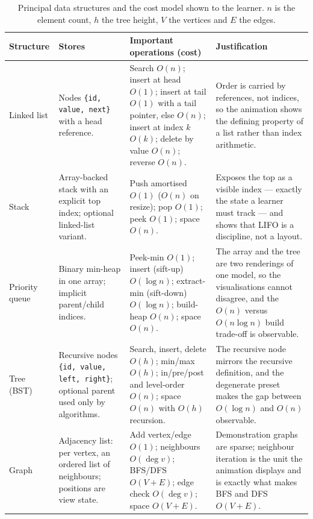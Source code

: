\documentclass[11pt,a4paper]{article}
\newcommand{\ct}[1]{\texttt{#1}}
\begin{document}
\begin{table}[H]
\centering
\small
\setlength{\tabcolsep}{4pt}
\begin{tabular}{@{}L{2.3cm}L{3.7cm}L{5.1cm}L{4.3cm}@{}}
\toprule
\textbf{Structure} & \textbf{Stores} & \textbf{Important operations (cost)} & \textbf{Justification} \\
\midrule
Linked list & Nodes \ct{\{id, value, next\}} with a head reference. &
Search $O(n)$; insert at head $O(1)$; insert at tail $O(1)$ with a tail pointer, else $O(n)$;
insert at index $k$ $O(k)$; delete by value $O(n)$; reverse $O(n)$. &
Order is carried by references, not indices, so the animation shows the defining property of a
list rather than index arithmetic. \\
Stack & Array-backed stack with an explicit top index; optional linked-list variant. &
Push amortised $O(1)$ ($O(n)$ on resize); pop $O(1)$; peek $O(1)$; space $O(n)$. &
Exposes the top as a visible index --- exactly the state a learner must track --- and shows that
LIFO is a discipline, not a layout. \\
Priority queue & Binary min-heap in one array; implicit parent/child indices. &
Peek-min $O(1)$; insert (sift-up) $O(\log n)$; extract-min (sift-down) $O(\log n)$;
build-heap $O(n)$; space $O(n)$. &
The array and the tree are two renderings of one model, so the visualisations cannot disagree,
and the $O(n)$ versus $O(n\log n)$ build trade-off is observable. \\
Tree (BST) & Recursive nodes \ct{\{id, value, left, right\}}; optional parent used only by
algorithms. &
Search, insert, delete $O(h)$; min/max $O(h)$; in/pre/post and level-order $O(n)$; space $O(n)$
with $O(h)$ recursion. &
The recursive node mirrors the recursive definition, and the degenerate preset makes the gap
between $O(\log n)$ and $O(n)$ observable. \\
Graph & Adjacency list: per vertex, an ordered list of neighbours; positions are view state. &
Add vertex/edge $O(1)$; neighbours $O(\deg v)$; BFS/DFS $O(V+E)$; edge check $O(\deg v)$;
space $O(V+E)$. &
Demonstration graphs are sparse; neighbour iteration is the unit the animation displays and is
exactly what makes BFS and DFS $O(V+E)$. \\
\bottomrule
\end{tabular}
\caption{Principal data structures and the cost model shown to the learner. $n$ is the element
count, $h$ the tree height, $V$ the vertices and $E$ the edges.}
\end{table}
\end{document}
